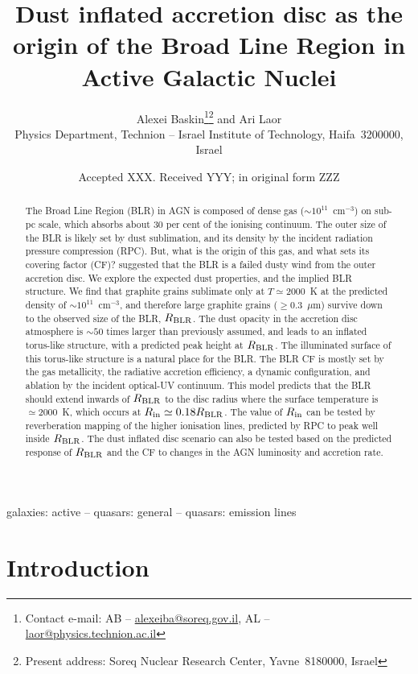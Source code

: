 \documentclass[a4paper,fleqn,usenatbib]{mnras}
\title[The origin of the BLR in AGN]{Dust inflated accretion disc as the origin of the Broad Line Region in Active Galactic Nuclei}
\author[A.~Baskin and A.~Laor]{
	Alexei Baskin\thanks{Contact e-mail: AB --  \href{mailto:alexeiba@soreq.gov.il}{alexeiba@soreq.gov.il}, AL -- \href{mailto:laor@physics.technion.ac.il}{laor@physics.technion.ac.il}}\thanks{Present address: Soreq Nuclear Research Center, Yavne~8180000, Israel}
	and Ari Laor\footnotemark[1]
	\\
	Physics Department, Technion -- Israel Institute of Technology, Haifa~3200000, Israel
}
\date{Accepted XXX. Received YYY; in original form ZZZ}
\newcommand{\mic}{\mbox{$\mu$m}}
\begin{document}
\label{firstpage}
\pagerange{\pageref{firstpage}--\pageref{lastpage}}
\maketitle
	

\begin{abstract}
The Broad Line Region (BLR) in AGN is composed of dense gas ($\sim 10^{11}$~cm$^{-3}$)
on sub-pc scale, which absorbs about 30 per cent of the ionising continuum. The outer size
of the BLR is likely set by dust sublimation, and its density by the incident radiation pressure compression
(RPC).
But, what is the origin of this gas, and what sets its covering factor (CF)? 
\citet{CH11} suggested that the BLR is a failed dusty wind from the outer accretion disc.
We explore the expected dust properties, and the implied BLR structure. 
We find that graphite grains sublimate only at $T\simeq 2000$~K at the predicted density of 
$\sim 10^{11}$~cm$^{-3}$, and therefore large graphite grains ($\ge 0.3$~\mic) survive down to the observed size of the BLR, $R_{\rm  BLR}$.
The dust opacity in the accretion disc atmosphere is $\sim 50$ times larger than previously assumed, and 
leads to an inflated torus-like structure, with a predicted 
peak height at $R_{\rm  BLR}$. The illuminated surface of this torus-like
structure is a natural place for the BLR.
The BLR CF is mostly set by the gas metallicity, the radiative accretion efficiency, a dynamic configuration,
and ablation by the incident optical-UV continuum.
This model predicts that the BLR should extend inwards of $R_{\rm  BLR}$ to the disc radius where the 
surface temperature is  $\simeq 2000$~K, which occurs at $R_{\rm in}\simeq 0.18 R_{\rm  BLR}$. 
The value of $R_{\rm in}$ can be tested by reverberation mapping of the higher 
ionisation lines, predicted by RPC to peak well inside $R_{\rm  BLR}$. 
The dust inflated disc scenario can also be tested based on the predicted response of $R_{\rm  BLR}$
and the CF to changes in the AGN luminosity and accretion rate.
\end{abstract}
	

\begin{keywords}
galaxies: active -- quasars: general -- quasars: emission lines
\end{keywords}
	

\section{Introduction}\label{sec:intro}
\end{document}
